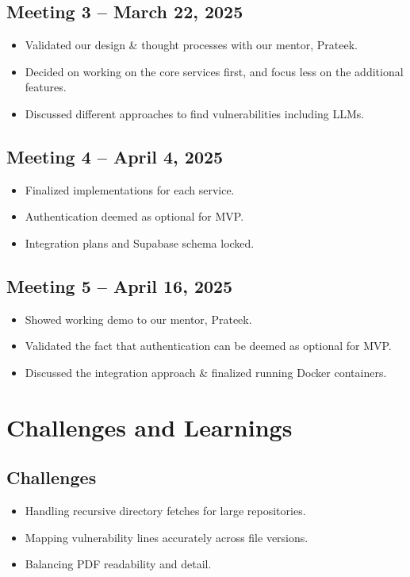 \documentclass{article}
\begin{document}
\subsection{Meeting 3 – March 22, 2025}
\begin{itemize}
    \item Validated our design \& thought processes with our mentor, Prateek.
    \item Decided on working on the core services first, and focus less on the additional features.
    \item Discussed different approaches to find vulnerabilities including LLMs.
\end{itemize}

\subsection{Meeting 4 – April 4, 2025}
\begin{itemize}
    \item Finalized implementations for each service.
    \item Authentication deemed as optional for MVP.
    \item Integration plans and Supabase schema locked.
\end{itemize}

\subsection{Meeting 5 – April 16, 2025}
\begin{itemize}
    \item Showed working demo to our mentor, Prateek.
    \item Validated the fact that authentication can be deemed as optional for MVP.
    \item Discussed the integration approach \& finalized running Docker containers.
\end{itemize}

\section{Challenges and Learnings}

\subsection{Challenges}
\begin{itemize}
    \item Handling recursive directory fetches for large repositories.
    \item Mapping vulnerability lines accurately across file versions.
    \item Balancing PDF readability and detail.
\end{itemize}
\end{document}
